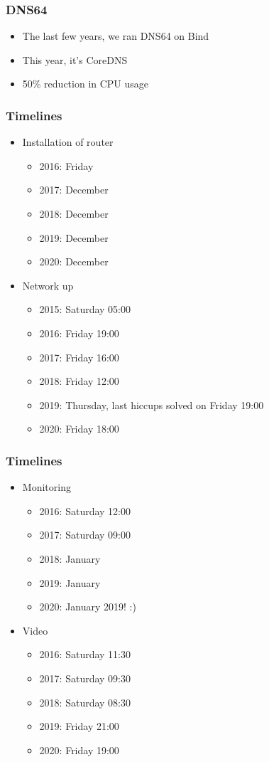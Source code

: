 \documentclass[aspectratio=169]{beamer}
\begin{document}
\begin{frame}
	\frametitle{DNS64}
	\vfill
	\begin{itemize}
		\item The last few years, we ran DNS64 on Bind
		\item This year, it's CoreDNS
		\item 50\% reduction in CPU usage
	\end{itemize}
	\vfill
\end{frame}

\begin{frame}
	\frametitle{Timelines}
	\vfill
	\begin{itemize}
		\item Installation of router
		\begin{itemize}
			\item 2016: Friday
			\item 2017: December
			\item 2018: December
			\item 2019: December
			\item 2020: December
		\end{itemize}
		\item Network up
		\begin{itemize}
			\item 2015: Saturday 05:00
			\item 2016: Friday 19:00
			\item 2017: Friday 16:00
			\item 2018: Friday 12:00
			\item 2019: Thursday, last hiccups solved on Friday 19:00
			\item 2020: Friday 18:00
		\end{itemize}
	\end{itemize}
	\vfill
\end{frame}

\begin{frame}
	\frametitle{Timelines}
	\begin{itemize}
	\vfill
		\item Monitoring
		\begin{itemize}
			\item 2016: Saturday 12:00
			\item 2017: Saturday 09:00
			\item 2018: January
			\item 2019: January
			\item 2020: January 2019! :)
		\end{itemize}
		\item Video
		\begin{itemize}
			\item 2016: Saturday 11:30
			\item 2017: Saturday 09:30
			\item 2018: Saturday 08:30
			\item 2019: Friday 21:00
			\item 2020: Friday 19:00
		\end{itemize}
	\end{itemize}
	\vfill
\end{frame}
\end{document}
